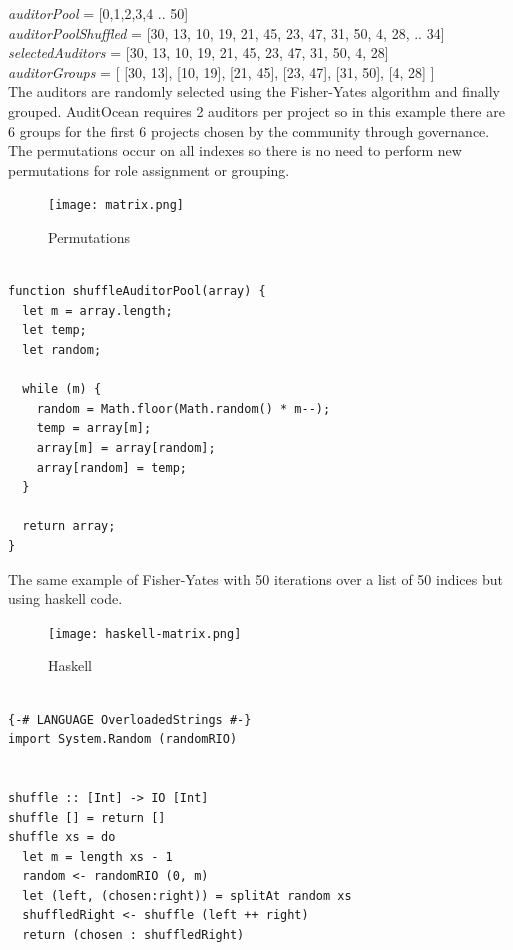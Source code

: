 \documentclass[9pt]{article}
\begin{document}
\emph {auditorPool } = [0,1,2,3,4 .. 50] \\
\emph { auditorPoolShuffled } = [30, 13, 10, 19, 21, 45, 23, 47, 31, 50,  4, 28, .. 34]\\
\emph { selectedAuditors} = [30, 13, 10, 19, 21, 45, 23, 47, 31, 50,  4, 28]\\
\emph { auditorGroups } = [ [30, 13], [10, 19], [21, 45], [23, 47], [31, 50],  [4, 28] ]\\

The auditors are randomly selected using the Fisher-Yates algorithm and finally grouped. AuditOcean requires 2 auditors per project so in this example there are 6 groups for the first 6 projects chosen by the community through governance. The permutations occur on all indexes so there is no need to perform new permutations for role assignment or grouping.
\begin{figure}[H]
  \centering
  \texttt{[image: matrix.png]}
  \caption{Permutations
  }
  \label{fig:matrix}
\end{figure}

\begin{tcolorbox}[title=Javascript Code]
\begin{verbatim}

function shuffleAuditorPool(array) { 
  let m = array.length;
  let temp;
  let random;

  while (m) {
    random = Math.floor(Math.random() * m--);
    temp = array[m];
    array[m] = array[random];
    array[random] = temp;
  }
  
  return array;
}
\end{verbatim}
\end{tcolorbox}

The same example of Fisher-Yates with 50 iterations over a list of 50 indices but using haskell code.

\begin{figure}[ht]
  \centering
  \texttt{[image: haskell-matrix.png]}
  \caption{Haskell
  }
  \label{fig:haskell-matrix}
\end{figure}


\begin{tcolorbox}[title=Haskell Code]
\begin{verbatim}

{-# LANGUAGE OverloadedStrings #-}
import System.Random (randomRIO)


shuffle :: [Int] -> IO [Int]
shuffle [] = return []
shuffle xs = do
  let m = length xs - 1
  random <- randomRIO (0, m)
  let (left, (chosen:right)) = splitAt random xs
  shuffledRight <- shuffle (left ++ right)
  return (chosen : shuffledRight)


\end{verbatim}
\end{tcolorbox}
\end{document}
